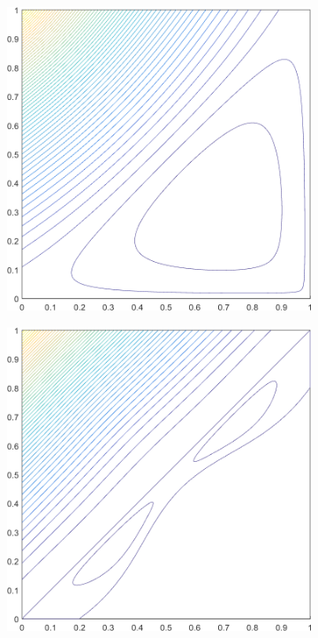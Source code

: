 \documentclass[11pt]{article}
\begin{document}
\begin{figure}
\begin{subfigure}[b]{0.240\textwidth}
		\caption{}
	\end{subfigure}
	\vfill
	\begin{subfigure}[b]{0.240\textwidth}
		\centering
		\includegraphics[width=\textwidth]{figures/square_MV2_contour_b4.png}
		\caption{}
	\end{subfigure}
	\hspace{1cm}
	\begin{subfigure}[b]{0.240\textwidth}
		\centering
		\includegraphics[width=\textwidth]{figures/square_MAXENT2_contour_b4.png}

\end{subfigure}
\end{figure}
\end{document}
